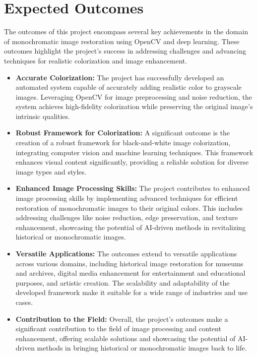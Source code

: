 \section{Expected Outcomes}

The outcomes of this project encompass several key achievements in the domain of monochromatic image restoration using OpenCV and deep learning. These outcomes highlight the project's success in addressing challenges and advancing techniques for realistic colorization and image enhancement.

\begin{itemize}
    \item \textbf{Accurate Colorization:}
The project has successfully developed an automated system capable of accurately adding realistic color to grayscale images. Leveraging OpenCV for image preprocessing and noise reduction, the system achieves high-fidelity colorization while preserving the original image's intrinsic qualities.

    \item \textbf{Robust Framework for Colorization:}
A significant outcome is the creation of a robust framework for black-and-white image colorization, integrating computer vision and machine learning techniques. This framework enhances visual content significantly, providing a reliable solution for diverse image types and styles.



    \item \textbf{Enhanced Image Processing Skills:}
    The project contributes to enhanced image processing skills by implementing advanced techniques for efficient restoration of monochromatic images to their original colors. This includes addressing challenges like noise reduction, edge preservation, and texture enhancement, showcasing the potential of AI-driven methods in revitalizing historical or monochromatic images.

    \item \textbf{Versatile Applications:}
    The outcomes extend to versatile applications across various domains, including historical image restoration for museums and archives, digital media enhancement for entertainment and educational purposes, and artistic creation. The scalability and adaptability of the developed framework make it suitable for a wide range of industries and use cases.

    \item \textbf{Contribution to the Field:}
   Overall, the project's outcomes make a significant contribution to the field of image processing and content enhancement, offering scalable solutions and showcasing the potential of AI-driven methods in bringing historical or monochromatic images back to life.
\end{itemize}
